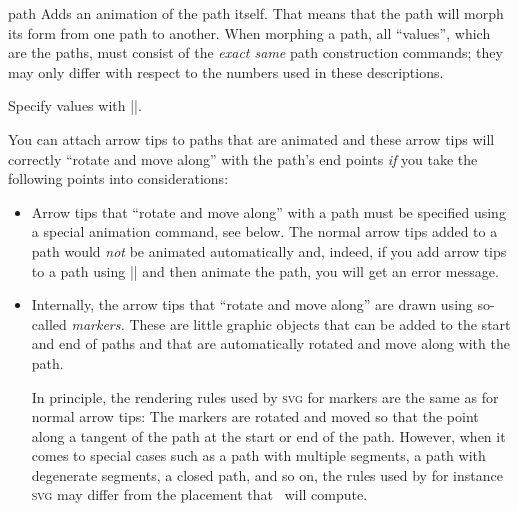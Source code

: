 \begin{sysanimateattribute}{path}
    Adds an animation of the path itself. That means that the path will morph
    its form from one path to another. When morphing a path, all ``values'',
    which are the paths, must consist of the \emph{exact same} path
    construction commands; they may only differ with respect to the numbers
    used in these descriptions.

    Specify values with |\pgfsysanimvalpath|.
\begin{codeexample}[
    preamble={\usetikzlibrary{animations}},
    animation list={0.5,1,1.5,2},
    animation bb={(0.9,-0.1)rectangle(2.1,1.1)},
]
\end{codeexample}

    You can attach arrow tips to paths that are animated and these arrow tips
    will correctly ``rotate and move along'' with the path's end points
    \emph{if} you take the following points into considerations:
    \begin{itemize}
        \item Arrow tips that ``rotate and move along'' with a path must be
            specified using a special animation command, see below. The normal
            arrow tips added to a path would \emph{not} be animated
            automatically and, indeed, if you add arrow tips to a path using
            |\pgfsetarrows| and then animate the path, you will get an error
            message.
        \item Internally, the arrow tips that ``rotate and move along'' are
            drawn using so-called \emph{markers.} These are little graphic
            objects that can be added to the start and end of paths and that
            are automatically rotated and move along with the path.

            In principle, the rendering rules used by \textsc{svg} for markers
            are the same as for normal arrow tips: The markers are rotated and
            moved so that the point along a tangent of the path at the start or
            end of the path. However, when it comes to special cases such as a
            path with multiple segments, a path with degenerate segments, a
            closed path, and so on, the rules used by for instance \textsc{svg}
            may differ from the placement that \pgfname\ will compute.


\end{itemize}
\end{sysanimateattribute}
